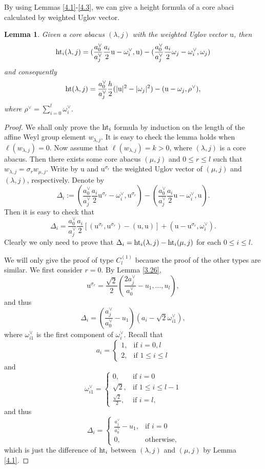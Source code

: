\documentclass[11pt]{amsart}
\theoremstyle{plain}
\numberwithin{equation}{subsection}
\newtheorem{lemma}[theorem]{Lemma}
\newcommand{\lam}{\lambda}
\begin{document}
By using Lemmas \ref{4.1}-\ref{4.3}, we can give a height formula of a core abaci calculated by weighted Uglov vector. 

\begin{lemma}\label{4.4}
Given a core abacus $(\lam, j)$ with the weighted Uglov vector $\mathrm{u}$, then
$${\rm ht}_i(\lambda, j)=(\frac{a_0^{\vee}}{a_j^{\vee}}\frac{a_i}{2}\mathrm{u}-\omega_{i}^\vee, \mathrm{u})-
(\frac{a_0^{\vee}}{a_j^{\vee}}\frac{a_i}{2}\omega_{j}-\omega_{i}^\vee,\omega_{j})$$
and consequently
$${\rm ht}(\lambda, j)=\frac{a_0^{\vee}}{a_j^{\vee}}\frac{h}{2}(|\mathrm{u}|^2-|\omega_{j}|^2)-(\mathrm{u}-\omega_{j}, \rho^{\vee}),$$
where $\rho^{\vee}=\sum_{i=0}^{l}\omega_{i}^{\vee}$.
\end{lemma}

\begin{proof}
We shall only prove the ${\rm ht}_i$ formula by induction on the length of the affine Weyl group element $w_{\lam, j}$.
It is easy to check the lemma holds when $\ell(w_{\lam, j})=0$. Now assume that $\ell(w_{\lam, j})=k>0$, where $(\lam, j)$ is a core abacus.
Then there exists some core abacus $(\mu, j)$ and $0\leq r\leq l$ such that $w_{\lam, j}=\sigma_rw_{\mu, j}$. 
Write by $\mathrm{u}$ and $\mathrm{u}^{\sigma_r}$ the weighted Uglov vector of $(\mu, j)$ and $(\lam, j)$, respectively.
Denote by 
$$\Delta_i :=(\frac{a_0^{\vee}}{a_j^{\vee}}\frac{a_i}{2}\mathrm{u}^{\sigma_r}-\omega_{i}^{\vee}, \mathrm{u}^{\sigma_r})-
(\frac{a_0^{\vee}}{a_j^{\vee}}\frac{a_i}{2}\mathrm{u}-\omega_{i}^{\vee}, \mathrm{u}).$$ Then it is easy to check that 
$$\Delta_i =\frac{a_0^{\vee}}{a_j^{\vee}}\frac{a_i}{2}[(\mathrm{u}^{\sigma_r}, \mathrm{u}^{\sigma_r})-(\mathrm{u}, \mathrm{u})]+(\mathrm{u}-\mathrm{u}^{\sigma_r},\omega_{i}^{\vee}).$$
Clearly we only need to prove that $\Delta_i={\rm ht}_i(\lam,j)-{\rm ht}_i(\mu,j)$ for each $0\leq i\leq l$.

\smallskip

We will only give the proof of type $C_l^{(1)}$ because the proof of the other types are similar. We first consider $r=0$. By Lemma \ref{3.26}, $$\mathrm{u}^{\sigma_r}=\frac{\sqrt{2}}{2}(\frac{2a_j^{\vee}}{a_0^{\vee}}-u_1, \ldots, u_l),$$ 
and thus $$\Delta_i = (\frac{a_j^{\vee}}{a_0^{\vee}}-u_1)(a_i-\sqrt{2}\omega_{i1}^{\vee}),$$ where $\omega_{i1}^{\vee}$ is the first component of $\omega_{i}^{\vee}$. 
Recall that 
$$a_i=\begin{cases}
1, & \mbox{if } i=0, l \\
2, & \mbox{if } 1\leq i\leq l
\end{cases}$$
and 
$$\omega_{i1}^{\vee}=\begin{cases}
0, & \mbox{if } i=0 \\
\sqrt{2}, & \mbox{if } 1\leq i\leq l-1 \\
\frac{\sqrt{2}}{2}, & \mbox{if } i=l,
\end{cases}$$
and thus
$$\Delta_i=\begin{cases}
\frac{a_j^{\vee}}{a_0^{\vee}}-u_1, & \mbox{if } i=0 \\
0, & \mbox{otherwise},
\end{cases}$$
which is just the difference of ${\rm ht}_i$ between $(\lam, j)$ and $(\mu, j)$ by Lemma \ref{4.1}.


\end{proof}
\end{document}
